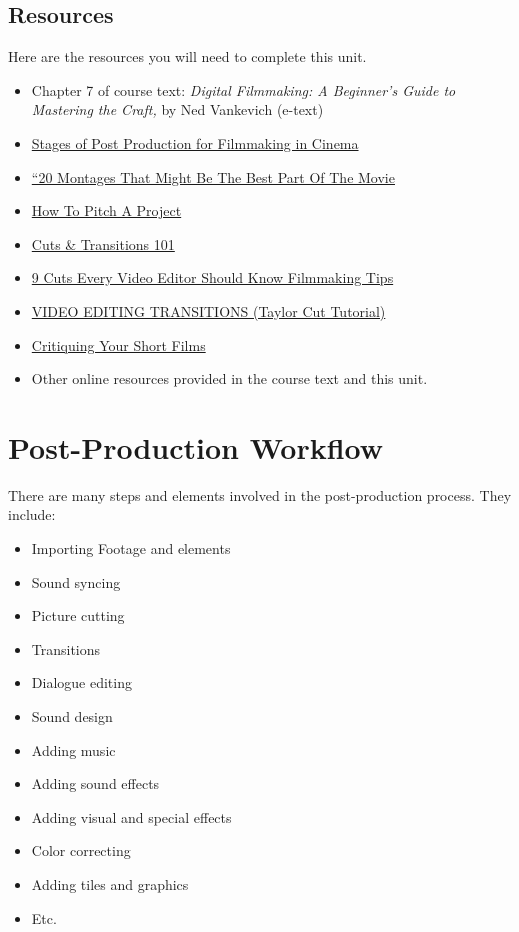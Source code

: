 \documentclass[
  letterpaper,
  DIV=11,
  numbers=noendperiod]{scrreprt}
\providecommand{\tightlist}{%
  \setlength{\itemsep}{0pt}\setlength{\parskip}{0pt}}\usepackage{longtable,booktabs,array}
\begin{document}
\subsection*{Resources}\label{resources-6}

Here are the resources you will need to complete this unit.

\begin{itemize}
\tightlist
\item
  Chapter 7 of course text: \emph{Digital Filmmaking: A Beginner's Guide
  to Mastering the Craft,} by Ned Vankevich (e-text)
\item
  \href{https://www.youtube.com/watch?v=IFjyVW21Vpw}{Stages of Post
  Production for Filmmaking in Cinema}
\item
  \href{https://www.refinery29.com/en-us/best-movie-montages}{``20
  Montages That Might Be The Best Part Of The Movie}
\item
  \href{https://www.youtube.com/watch?v=dak2DkfDTuU}{How To Pitch A
  Project}
\item
  \href{https://www.youtube.com/watch?v=OAH0MoAv2CI&t=31s}{Cuts \&
  Transitions 101}
\item
  \href{https://www.youtube.com/watch?v=Wv3Hmf2Dxlo}{9 Cuts Every Video
  Editor Should Know \textbar{} Filmmaking Tips}
\item
  \href{https://www.youtube.com/watch?v=bdpbYeoZKnk}{VIDEO EDITING
  TRANSITIONS (Taylor Cut Tutorial)}
\item
  \href{https://www.youtube.com/watch?v=x5ASDkOSIBE}{Critiquing Your
  Short Films}
\item
  Other online resources provided in the course text and this unit.
\end{itemize}

\section{Post-Production Workflow}\label{post-production-workflow}

There are many steps and elements involved in the post-production
process. They include:

\begin{itemize}
\tightlist
\item
  Importing Footage and elements
\item
  Sound syncing
\item
  Picture cutting
\item
  Transitions
\item
  Dialogue editing
\item
  Sound design
\item
  Adding music
\item
  Adding sound effects
\item
  Adding visual and special effects
\item
  Color correcting
\item
  Adding tiles and graphics
\item
  Etc.
\end{itemize}
\end{document}
